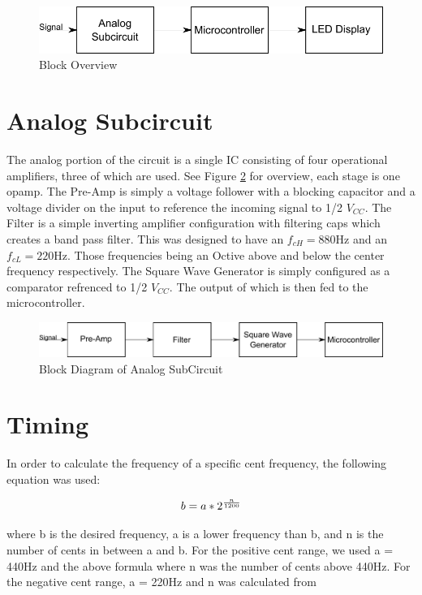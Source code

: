 \documentclass[12pt]{article}
\begin{document}
\begin{figure}[H]
\centering
	\includegraphics[width=6in]{"Block Overview"}
	\caption{Block Overview}
	\label{block_overview} 
\end{figure}

\section{Analog Subcircuit}
The analog portion of the circuit is a single IC consisting of four operational amplifiers, three of which are used. See Figure \ref{analog_block} for overview, each stage is one opamp. The Pre-Amp is simply a voltage follower with a blocking capacitor and a voltage divider on the input to reference the incoming signal to 1/2 $V_{CC}$. The Filter is a simple inverting amplifier configuration with filtering caps which creates a band pass filter. This was designed to have an $f_{cH }= 880 \mbox{Hz}$ and an $f_{cL} = 220 \mbox{Hz}$. Those frequencies being an Octive above and below the center frequency respectively. The Square Wave Generator is simply configured as a comparator refrenced to 1/2 $V_{CC}$. The output of which is then fed to the microcontroller.

\begin{figure}[H]
\centering
	\includegraphics[width=6in]{"Analog Subcircuit"}
	\caption{Block Diagram of Analog SubCircuit}
	\label{analog_block} 
\end{figure}

\section{Timing}

In order to calculate the frequency of a specific cent frequency, the following equation was used:

\begin{equation}
b = a * 2^{n \over 1200}
\end{equation}

where b is the desired frequency, a is a lower frequency than b, and n is the number of cents in between
a and b. For the positive cent range, we used a = 440Hz and the above formula where n was the number
of cents above 440Hz. For the negative cent range, a = 220Hz and n was calculated from
\end{document}
